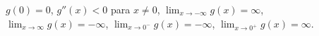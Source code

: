 \item $g(0) = 0$, $g''(x) < 0$ para $x \ne 0$, $\lim_{x \to -\infty} g(x) = \infty$, $\lim_{x \to \infty} g(x) = -\infty$, $\lim_{x \to 0^-} g(x) = -\infty$, $\lim_{x \to 0^+} g(x) = \infty$.
